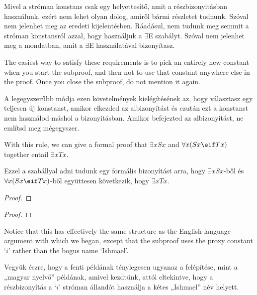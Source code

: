 Mivel a stróman konstans csak egy helyettesítő, amit a részbizonyitásban használunk, ezért nem lehet olyan dolog, amiről bármi részletet tudnunk. Szóval nem jelenhet meg az eredeti kijelentésben. Ráadásul, nem tudunk meg semmit a stróman konstansról azzal, hogy használjuk a $\exists$E szabályt. Szóval nem jelenhet meg a  mondatban, amit a  $\exists$E használatával bizonyítasz.

The easiest way to satisfy these requirements is to pick an entirely new constant when you start the subproof, and then not to use that constant anywhere else in the proof. Once you close the subproof, do not mention it again.

A legegyszerűbb módja ezen követelmények kielégítésének az, hogy választasz egy teljesen új konstanst, amikor elkezded az albizonyítást és ezután ezt a konstanst nem használod máshol a bizonyításban. Amikor befejezted az albizonyitást, ne említsd meg mégegyszer.

With this rule, we can give a formal proof that $\exists x Sx$ and $\forall x(Sx \eif Tx)$ together entail $\exists x Tx$.

Ezzel a szabállyal adni tudunk egy formális bizonyítást arra, hogy $\exists x Sx$-ből és $\forall x(Sx \eif Tx)$-ből együttesen következik, hogy $\exists x Tx$.



\begin{proof}
	\open
		 
	\close
\end{proof}

\begin{proof}
	\open
		 
	\close
\end{proof}

Notice that this has effectively the same structure as the English-language argument with which we began, except that the subproof uses the proxy constant `$i$' rather than the bogus name `Ishmael'.

Vegyük észre, hogy a fenti példának ténylegesen ugyanaz a felépítése, mint a „magyar nyelvő” példának, amivel kezdtünk, attól eltekintve, hogy a részbizonyítás a `$i$' stróman állandót használja a kétes „Ishmael” név helyett.

